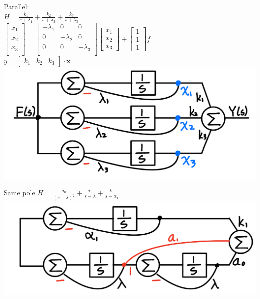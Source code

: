 \documentclass[4pt]{article}
\theoremstyle{definition}
\theoremstyle{definition}
\begin{document}
\begin{landscape}
\begin{multicols}{3}
    Parallel:\\
    \(H = \frac{k_1}{s+\lambda_1} + \frac{k_2}{s+\lambda_2} + \frac{k_3}{s+\lambda_3}\)\\
    \(
    \begin{bmatrix}
        \dot{x}_1\\
        \dot{x}_2\\
        \dot{x}_3\\
    \end{bmatrix}
    =
    \begin{bmatrix}
        -\lambda_1 & 0 & 0\\
        0 & -\lambda_2 & 0\\
        0 & 0 & -\lambda_3\\    %
    \end{bmatrix}
    \begin{bmatrix}
        x_1\\
        x_2\\
        x_3
    \end{bmatrix}
    +
    \begin{bmatrix}
        1\\1\\1         %
    \end{bmatrix}
    f
    \)\\

    \(y =
    \begin{bmatrix}
        k_1 & k_2 & k_3       %
    \end{bmatrix}
    \cdot \mathbf x
    \)
    \includegraphics[width=0.75\linewidth]{figures/parallel.jpg}


    Same pole                           %
    \(H = \frac{a_0}{(s-\lambda)^2} + \frac{a_1}{s-\lambda} + \frac{k_1}{s-\alpha_1}\)      %
    \includegraphics[width=0.7\linewidth]{figures/multipole.jpg}


\end{multicols}
\end{landscape}
\end{document}

